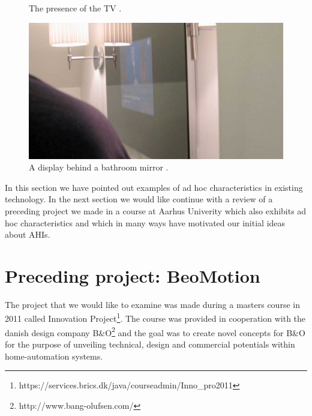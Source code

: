 \begin{figure}[h]
\begin{minipage}[b]{.44\textwidth}
		\caption{The presence of the TV \citep{lynggaard2012had}.}
		\label{fig:ch:adhoc:dubai-tv}
	\end{minipage}
\end{figure}

\begin{figure}[h]
	\centering
  		\includegraphics[width=.9\textwidth]{figures/adhoc/dubai-mirror}
	\caption{A display behind a bathroom mirror \citep{lynggaard2012had}.}
   \label{fig:ch:adhoc:dubai-mirror}
\end{figure}

\blank
In this section we have pointed out examples of ad hoc characteristics in existing technology.
In the next section we would like continue with a review of a preceding project we made in a course at Aarhus Univerity which also exhibits ad hoc characteristics and which in many ways have motivated our initial ideas about AHIs.

\section{Preceding project: BeoMotion}

The project that we would like to examine was made during a masters course in 2011 called Innovation Project\footnote{https://services.brics.dk/java/courseadmin/Inno\_pro2011}.
The course was provided in cooperation with the danish design company B\&O\footnote{http://www.bang-olufsen.com/} and the goal was to create novel concepts for B\&O for the purpose of unveiling technical, design and commercial potentials within home-automation systems.

